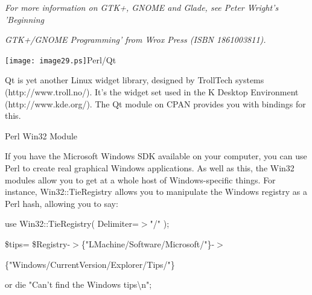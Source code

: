 \documentclass[a4paper,11pt]{book}
\begin{document}
\noindent 

\noindent 

\noindent 

\noindent 

\noindent 

\noindent 

\noindent 

\noindent 

\noindent 

\noindent 

\noindent 

\noindent 

\noindent 

\noindent 

\noindent \textit{For more information on GTK+, GNOME and Glade, see Peter Wright's 'Beginning}

\noindent \textit{GTK+/GNOME Programming' from Wrox Press (ISBN 1861003811).}

\noindent 

\noindent \texttt{[image: image29.ps]}Perl/Qt

\noindent 

\noindent Qt is yet another Linux widget library, designed by TrollTech systems (http://www.troll.no/). It's the widget set used in the K Desktop Environment (http://www.kde.org/). The Qt module on CPAN provides you with bindings for this.

\noindent 

\noindent 

\noindent Perl Win32 Module

\noindent 

\noindent If you have the Microsoft Windows SDK available on your computer, you can use Perl to create real graphical Windows applications. As well as this, the Win32 modules allow you to get at a whole host of Windows-specific things. For instance, Win32::TieRegistry allows you to manipulate the Windows registry as a Perl hash, allowing you to say:

\noindent 

\noindent use Win32::TieRegistry( Delimiter=$>$"/" );

\noindent 

\noindent \$tips= \$Registry-$>$\{"LMachine/Software/Microsoft/"\}-$>$

\noindent \{"Windows/CurrentVersion/Explorer/Tips/"\}

\noindent or  die "Can't find the Windows tips\textbackslash n";
\end{document}
